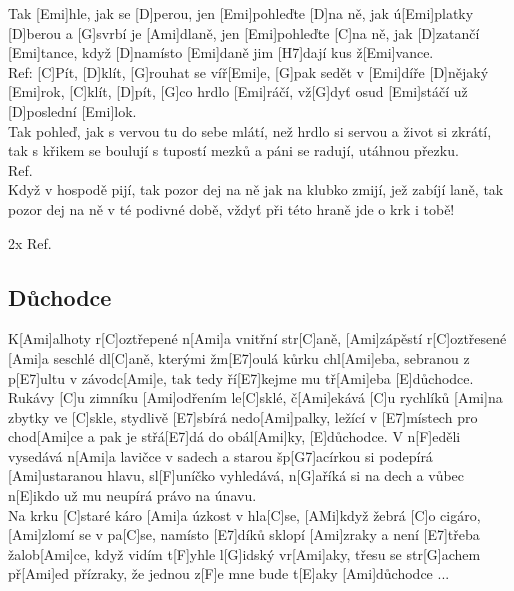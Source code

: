 \documentclass[10pt]{article}
\begin{document}
\begin{Large}
\begin{minipage}{\textwidth}
\begin{multicols}{2}
\begin{guitar}
	Tak [Emi]hle, jak se [D]perou, jen [Emi]pohleďte [D]na ně,
	jak ú[Emi]platky [D]berou a [G]svrbí je [Ami]dlaně,
	jen [Emi]pohleďte [C]na ně, jak [D]zatančí [Emi]tance,
	když [D]namísto [Emi]daně jim [H7]dají kus ž[Emi]vance.
	\\
	Ref: [C]Pít, [D]klít, [G]rouhat se víř[Emi]e,
	[G]pak sedět v [Emi]díře [D]nějaký [Emi]rok,
	[C]klít, [D]pít, [G]co hrdlo [Emi]ráčí,
	vž[G]dyť osud [Emi]stáčí už [D]poslední [Emi]lok.
	\\
	Tak pohleď, jak s vervou tu do sebe mlátí,
	než hrdlo si servou a život si zkrátí,
	tak s křikem se boulují s tupostí mezků
	a páni se radují, utáhnou přezku.
	\\
	Ref.
	\\
	Když v hospodě pijí, tak pozor dej na ně
	jak na klubko zmijí, jež zabíjí laně,
	tak pozor dej na ně v té podivné době,
	vždyť při této hraně jde o krk i tobě!
	
	2x Ref.	
\end{guitar}
\end{multicols}
\end{minipage}

\begin{minipage}{\textwidth}
\subsection{Důchodce}
\begin{multicols}{2}
\begin{guitar}
	K[Ami]alhoty r[C]oztřepené n[Ami]a vnitřní str[C]aně,
	[Ami]zápěstí r[C]oztřesené [Ami]a seschlé dl[C]aně,
	kterými žm[E7]oulá kůrku chl[Ami]eba,
	sebranou z p[E7]ultu v závodc[Ami]e,
	tak tedy ří[E7]kejme mu tř[Ami]eba [E]důchodce.
	\\
	[Ami]Rukávy [C]u zimníku [Ami]odřením le[C]sklé,
	č[Ami]ekává [C]u rychlíků [Ami]na zbytky ve [C]skle,
	stydlivě [E7]sbírá nedo[Ami]palky,
	ležící v [E7]místech pro chod[Ami]ce
	a pak je střá[E7]dá do obál[Ami]ky, [E]důchodce.
	\columnbreak
	V n[F]eděli vysedává n[Ami]a lavičce v sadech
	a starou šp[G7]acírkou
	 si podepírá [Ami]ustaranou hlavu,
	sl[F]uníčko vyhledává, n[G]aříká si na dech
	a vůbec n[E]ikdo už mu neupírá právo na únavu.
	\\
	[Ami]Na krku [C]staré káro [Ami]a úzkost v hla[C]se,
	[AMi]když žebrá [C]o cigáro, [Ami]zlomí se v pa[C]se,
	namísto [E7]díků sklopí [Ami]zraky 
	a není [E7]třeba žalob[Ami]ce,
	když vidím t[F]yhle l[G]idský vr[Ami]aky, 
	třesu se str[G]achem př[Ami]ed přízraky,
	že jednou z[F]e mne bude t[E]aky [Ami]důchodce ...
\end{guitar}
\end{multicols}
\end{minipage}


\end{Large}
\end{document}
